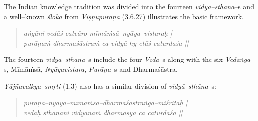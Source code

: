 The Indian knowledge tradition was divided into the fourteen \textit{vidyā–sthāna}–s and a well–known \textit{śloka} from \textit{Viṣṇupurāṇa} (3.6.27) illustrates the basic framework.

\vspace{-.3cm}

\begin{verse}
\textit{aṅgāni vedāś catvāro mīmāṁsā–nyāya–vistaraḥ | }\\\textit{purāṇaṁ dharmaśāstraṁ ca vidyā hy etāś caturdaśa ||}
\end{verse}

\vspace{-.3cm}

The fourteen \textit{vidyā–sthāna}–s include the four \textit{Veda}–s along with the six \textit{Vedāṅga}–s, Mīmāṁsā, \textit{Nyāyavistara}, \textit{Purāṇa}–s and Dharmaśāstra.


\textit{Yājñavalkya–smṛti} (1.3) also has a similar division of \textit{vidyā–sthāna}–s:

\vspace{-.3cm}

\begin{verse}
\textit{purāṇa–nyāya–mīmāṁsā–dharmaśāstrāṅga–miśritāḥ |}\\\textit{vedāḥ sthānāni vidyānāṁ dharmasya ca caturdaśa ||}
\end{verse}

\vspace{-.3cm}

